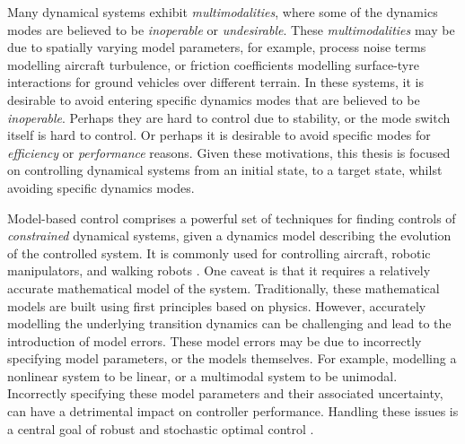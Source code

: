 \documentclass{mimosis-class/mimosis}
\numberwithin{equation}{chapter}
\begin{document}
Many dynamical systems exhibit \emph{multimodalities}, where some of the dynamics modes
are believed to be \emph{inoperable} or \emph{undesirable}.
These \emph{multimodalities} may be due to spatially varying model parameters, for example,
process noise terms modelling aircraft turbulence, or friction coefficients modelling
surface-tyre interactions for ground vehicles over different terrain.
In these systems, it is desirable to avoid entering specific dynamics modes that are believed to be \emph{inoperable}.
Perhaps they are hard to control due to stability, or the mode switch itself is hard to control.
Or perhaps it is desirable to avoid specific modes for \emph{efficiency} or \emph{performance} reasons.
Given these motivations, this thesis is focused on controlling dynamical systems from an initial state,
to a target state, whilst avoiding specific dynamics modes.

Model-based control comprises a powerful set of techniques for finding controls of \emph{constrained} dynamical
systems, given a dynamics model describing the evolution of the controlled system.
It is commonly used for controlling aircraft, robotic manipulators, and walking
robots \citep{vonstrykDirect1992,bettsSurvey1998,gargUnified2010}.
One caveat is that it requires a relatively accurate mathematical model of the system.
Traditionally, these mathematical models are built using first principles based on physics.
However, accurately modelling the underlying transition dynamics can be challenging and
lead to the introduction of model errors.
These model errors may be due to incorrectly specifying model parameters, or the
models themselves.
For example, modelling a nonlinear system to be linear, or a multimodal system to be unimodal.
Incorrectly specifying these model parameters and their associated uncertainty,
can have a detrimental impact on controller performance.
Handling these issues is a central goal of robust and stochastic optimal
control \citep{freemanRobust1996,stengelStochastic1986}.
\end{document}
